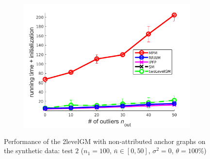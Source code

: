 \begin{figure}[h]
\begin{subfigure}[b]{0.3\textwidth}
		\includegraphics[scale=0.25]{"chapter3/fig/SyntheticTest/no_descr/Results_v4.3.3/Test3/time_summary_avg10t"} 
	\end{subfigure} 	
	\caption[Performance of the 2levelGM with non-attributed anchor graphs on the synthetic data (test $2$)]{Performance of the 2levelGM with non-attributed anchor graphs on the synthetic data: test $2$ ($n_1=100$, $\bar{n}\in[0,50]$, $\sigma^2=0$, $\theta=100\%$)}
	\label{fig:synTest2_ver433}
\end{figure}
\vspace{-10pt}
